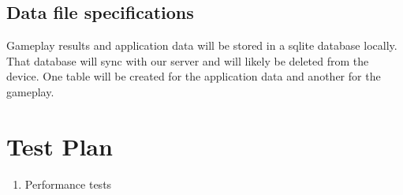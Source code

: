 \documentclass[a4wide]{article}
\begin{document}
\subsection{Data file specifications}

Gameplay results and application data will be stored in a sqlite database locally.  That database will sync with our server and will likely be deleted from the device.  One table will be created for the application data and another for the gameplay.


\section{Test Plan}
\begin{enumerate}
\item Performance tests
\begin{enumerate}



\end{enumerate}
\end{enumerate}
\end{document}
